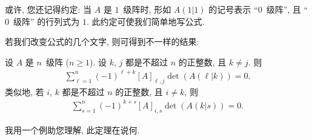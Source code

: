 \documentclass[../libro.tex]{subfiles}
\begin{document}


或许, 您还记得约定:
当 \(A\) 是 \(1\)~级阵时,
形如 \(A(1|1)\) 的记号表示 ``\(0\)~级阵'',
且 ``\(0\)~级阵'' 的行列式为 \(1\).
此约定可使我们简单地写公式.

若我们改变公式的几个文字,
则可得到不一样的结果:

\begin{theorem}
    设 \(A\) 是 \(n\)~级阵 (\(n \geq 1\)).
    设 \(k\), \(j\) 都是不超过 \(n\) 的正整数,
    且 \(k \neq j\).
    则
    \begin{align*}
        \sum_{\ell = 1}^{n}
        {(-1)^{\ell+k} [A]_{\ell,j} \det {(A(\ell|k))}}
        = 0.
    \end{align*}
    类似地, 若 \(i\), \(k\) 都是不超过 \(n\) 的正整数,
    且 \(i \neq k\),
    则
    \begin{align*}
        \sum_{s = 1}^{n}
        {(-1)^{k+s} [A]_{i,s} \det {(A(k|s))}}
        = 0.
    \end{align*}
\end{theorem}

我用一个例助您理解, 此定理在说何.
\end{document}

